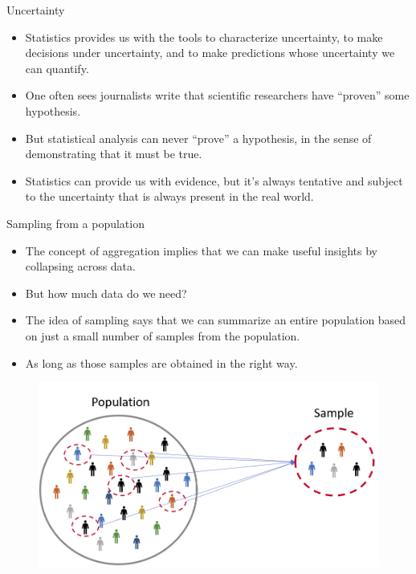 \documentclass[handout]{beamer}
\begin{document}
\begin{frame}{Uncertainty}

\scriptsize{
\begin{itemize}
\item Statistics provides us with the tools to characterize uncertainty, to make decisions under uncertainty, and to make predictions whose uncertainty we can quantify.

\item One often sees journalists write that scientific researchers have ``proven'' some hypothesis. 
\item But statistical analysis can never ``prove'' a hypothesis, in the sense of demonstrating that it must be true.
\item Statistics can provide us with evidence, but it's always tentative and subject to the uncertainty that is always present in the real world.
\end{itemize}
}
 
\end{frame}


\begin{frame}{Sampling from a population}

\scriptsize{
\begin{itemize}
\item The concept of aggregation implies that we can make useful insights by collapsing across data.
\item But how much data do we need? 
\item The idea of sampling says that we can summarize an entire population based on just a small number of samples from the population.
\item As long as those samples are obtained in the right way. 
\end{itemize}

}

\begin{figure}[h!]
	\centering
	\includegraphics[scale=0.3]{pics/sampling.png}
\end{figure}
 
\end{frame}
\end{document}
